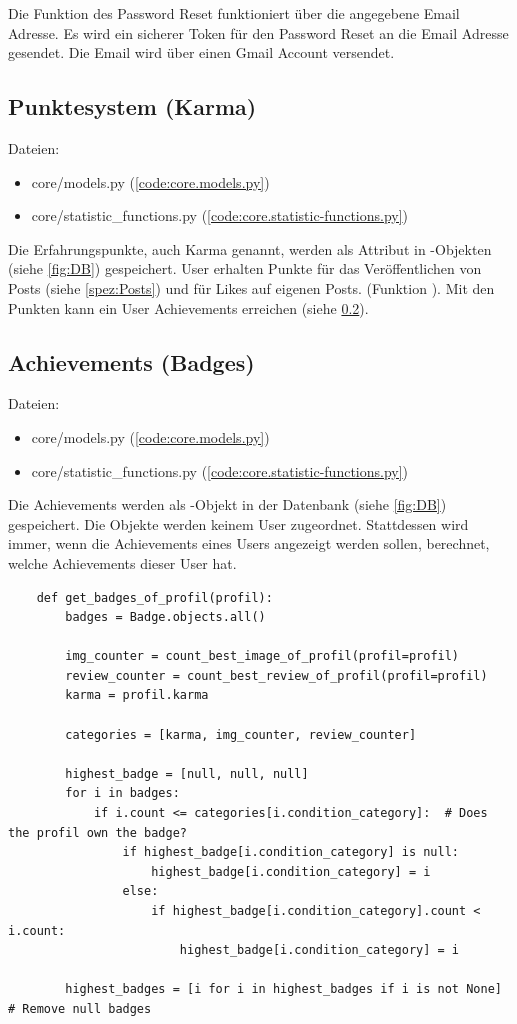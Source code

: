 Die Funktion des Password Reset funktioniert über die angegebene Email Adresse.
Es wird ein sicherer Token für den Password Reset an die Email Adresse gesendet.
Die Email wird über einen Gmail Account versendet.


\subsection{Punktesystem (Karma)} \label{spez:Karma}

Dateien:
\begin{itemize}
    \item core/models.py (\ref{code:core.models.py})
    \item core/statistic\_functions.py (\ref{code:core.statistic-functions.py})
\end{itemize}

Die Erfahrungspunkte, auch Karma genannt, werden als Attribut in
-Objekten (siehe \ref{fig:DB}) gespeichert. User erhalten Punkte
für das Veröffentlichen von Posts (siehe \ref{spez:Posts}) und für Likes auf
eigenen Posts. (Funktion ). Mit den Punkten kann
ein User Achievements erreichen (siehe \ref{spez:Badges}).

\subsection{Achievements (Badges)} \label{spez:Badges}

Dateien:
\begin{itemize}
    \item core/models.py (\ref{code:core.models.py})
    \item core/statistic\_functions.py (\ref{code:core.statistic-functions.py})
\end{itemize}

Die Achievements werden als -Objekt in der Datenbank (siehe
\ref{fig:DB}) gespeichert. Die Objekte werden keinem User zugeordnet.
Stattdessen wird immer, wenn die Achievements eines Users angezeigt werden
sollen, berechnet, welche Achievements dieser User hat.

\begin{lstlisting}
    def get_badges_of_profil(profil):
        badges = Badge.objects.all()
 
        img_counter = count_best_image_of_profil(profil=profil)
        review_counter = count_best_review_of_profil(profil=profil)
        karma = profil.karma

        categories = [karma, img_counter, review_counter]

        highest_badge = [null, null, null]
        for i in badges:
            if i.count <= categories[i.condition_category]:  # Does the profil own the badge?
                if highest_badge[i.condition_category] is null:
                    highest_badge[i.condition_category] = i
                else:
                    if highest_badge[i.condition_category].count < i.count:
                        highest_badge[i.condition_category] = i
        
        highest_badges = [i for i in highest_badges if i is not None]  # Remove null badges
\end{lstlisting}

